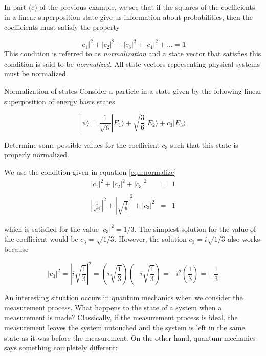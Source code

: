 In part (c) of the previous example, we see that if the squares of the coefficients in a linear superposition state give us information about probabilities, then the coefficients must satisfy the property

\begin{equation}
|c_1|^2 + |c_2|^2 + |c_3|^2 + |c_4|^2 + \ldots = 1
\label{eqn:normalize}
\end{equation}
This condition is referred to as {\em normalization} and a state vector that satisfies this condition is said to be {\em normalized}.  All state vectors representing physical systems must be normalized.

\begin{example}{Normalization of states}
\label{exam:Normalized}
Consider a particle in a state given by the following linear superposition of energy basis states

\begin{equation}
|\mbox{$\psi$}\rangle = \frac{1}{\sqrt{6}} |\mbox{$E_1$}\rangle + \sqrt{\frac{3}{6}} |\mbox{$E_2$}\rangle + c_3 |\mbox{$E_3$}\rangle
\end{equation}

Determine some possible values for the coefficient $c_3$ such that this state is properly normalized.

\solution We use the condition given in equation \ref{eqn:normalize}
\begin{eqnarray}
|c_1|^2 + |c_2|^2 + |c_3|^2 & = & 1 \nonumber\\
\nonumber \\
\left|\frac{1}{\sqrt{6}}\right|^2 + \left|\sqrt{\frac{3}{6}}\right|^2 + |c_3|^2 & = & 1 \nonumber 
\end{eqnarray}

\noindent which is satisfied for the value $|c_3|^2 = 1/3$.  The simplest solution for the value of the coefficient would be $c_3 = \sqrt{1/3}$.  
However, the solution $c_3 = i \sqrt{1/3}$ also works because 

\begin{equation}
|c_3|^2 = \left| i \sqrt{\frac{1}{3}}\right|^2 = \left( i \sqrt{\frac{1}{3}} \right) \left( -i \sqrt{\frac{1}{3}} \right) = - i^2 \left(\frac{1}{3} \right) = + \frac{1}{3} \nonumber
\end{equation}

\end{example}

An interesting situation occurs in quantum mechanics when we consider the measurement process.  What happens to the state of a system when a measurement is made?  Classically, if the measurement process is ideal, the measurement leaves the system untouched and the system is left in the same state as it was before the measurement.  On the other hand, quantum mechanics says something completely different:

